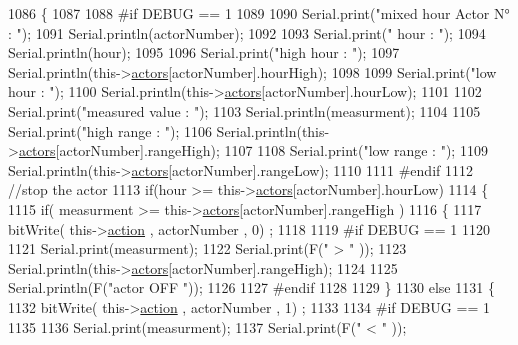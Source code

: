 \begin{DoxyCode}
1086 \{
1087 
1088 \textcolor{preprocessor}{#if DEBUG == 1}
1089     
1090     Serial.print(\textcolor{stringliteral}{"mixed hour Actor N° : "});
1091     Serial.println(actorNumber);
1092 
1093     Serial.print(\textcolor{stringliteral}{" hour : "});
1094     Serial.println(hour);
1095 
1096     Serial.print(\textcolor{stringliteral}{"high hour : "});
1097     Serial.println(this->\hyperlink{class_jetpack_a7e16d2f97837f9712a2e6de1c50d99db}{actors}[actorNumber].hourHigh);
1098 
1099     Serial.print(\textcolor{stringliteral}{"low hour : "});
1100     Serial.println(this->\hyperlink{class_jetpack_a7e16d2f97837f9712a2e6de1c50d99db}{actors}[actorNumber].hourLow);
1101 
1102     Serial.print(\textcolor{stringliteral}{"measured value : "});
1103     Serial.println(measurment);
1104 
1105     Serial.print(\textcolor{stringliteral}{"high range : "});
1106     Serial.println(this->\hyperlink{class_jetpack_a7e16d2f97837f9712a2e6de1c50d99db}{actors}[actorNumber].rangeHigh);
1107 
1108     Serial.print(\textcolor{stringliteral}{"low range : "});
1109     Serial.println(this->\hyperlink{class_jetpack_a7e16d2f97837f9712a2e6de1c50d99db}{actors}[actorNumber].rangeLow);
1110 
1111 \textcolor{preprocessor}{#endif}
1112     \textcolor{comment}{//stop the actor    }
1113     \textcolor{keywordflow}{if}(hour >= this->\hyperlink{class_jetpack_a7e16d2f97837f9712a2e6de1c50d99db}{actors}[actorNumber].hourLow)
1114     \{
1115             \textcolor{keywordflow}{if}( measurment >= this->\hyperlink{class_jetpack_a7e16d2f97837f9712a2e6de1c50d99db}{actors}[actorNumber].rangeHigh )
1116             \{
1117                 bitWrite( this->\hyperlink{class_jetpack_aca3142925a7b0834b34ae91d26af7765}{action} , actorNumber , 0) ;
1118 
1119 \textcolor{preprocessor}{            #if DEBUG == 1 }
1120 
1121                 Serial.print(measurment);
1122                 Serial.print(F(\textcolor{stringliteral}{" > "} ));
1123                 Serial.println(this->\hyperlink{class_jetpack_a7e16d2f97837f9712a2e6de1c50d99db}{actors}[actorNumber].rangeHigh);
1124 
1125                 Serial.println(F(\textcolor{stringliteral}{"actor OFF "}));
1126 
1127 \textcolor{preprocessor}{            #endif  }
1128 
1129             \}
1130             \textcolor{keywordflow}{else} 
1131             \{
1132                 bitWrite( this->\hyperlink{class_jetpack_aca3142925a7b0834b34ae91d26af7765}{action} , actorNumber , 1) ;
1133 
1134 \textcolor{preprocessor}{            #if DEBUG == 1 }
1135 
1136                 Serial.print(measurment);
1137                 Serial.print(F(\textcolor{stringliteral}{" < "} ));

\end{DoxyCode}
